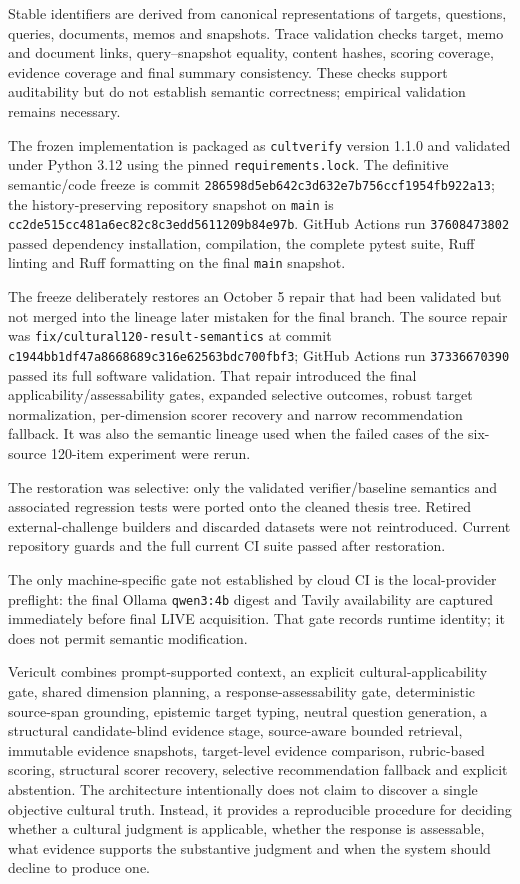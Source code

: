 Stable identifiers are derived from canonical representations of targets, questions, queries, documents, memos and snapshots. Trace validation checks target, memo and document links, query--snapshot equality, content hashes, scoring coverage, evidence coverage and final summary consistency. These checks support auditability but do not establish semantic correctness; empirical validation remains necessary.

The frozen implementation is packaged as \texttt{cultverify} version 1.1.0 and validated under Python 3.12 using the pinned \texttt{requirements.lock}. The definitive semantic/code freeze is commit \texttt{286598d5eb642c3d632e7b756ccf1954fb922a13}; the history-preserving repository snapshot on \texttt{main} is \texttt{cc2de515cc481a6ec82c8c3edd5611209b84e97b}. GitHub Actions run \texttt{37608473802} passed dependency installation, compilation, the complete pytest suite, Ruff linting and Ruff formatting on the final \texttt{main} snapshot.

The freeze deliberately restores an October 5 repair that had been validated but not merged into the lineage later mistaken for the final branch. The source repair was \texttt{fix/cultural120-result-semantics} at commit \texttt{c1944bb1df47a8668689c316e62563bdc700fbf3}; GitHub Actions run \texttt{37336670390} passed its full software validation. That repair introduced the final applicability/assessability gates, expanded selective outcomes, robust target normalization, per-dimension scorer recovery and narrow recommendation fallback. It was also the semantic lineage used when the failed cases of the six-source 120-item experiment were rerun.

The restoration was selective: only the validated verifier/baseline semantics and associated regression tests were ported onto the cleaned thesis tree. Retired external-challenge builders and discarded datasets were not reintroduced. Current repository guards and the full current CI suite passed after restoration.

The only machine-specific gate not established by cloud CI is the local-provider preflight: the final Ollama \texttt{qwen3:4b} digest and Tavily availability are captured immediately before final LIVE acquisition. That gate records runtime identity; it does not permit semantic modification.

Vericult combines prompt-supported context, an explicit cultural-applicability gate, shared dimension planning, a response-assessability gate, deterministic source-span grounding, epistemic target typing, neutral question generation, a structural candidate-blind evidence stage, source-aware bounded retrieval, immutable evidence snapshots, target-level evidence comparison, rubric-based scoring, structural scorer recovery, selective recommendation fallback and explicit abstention. The architecture intentionally does not claim to discover a single objective cultural truth. Instead, it provides a reproducible procedure for deciding whether a cultural judgment is applicable, whether the response is assessable, what evidence supports the substantive judgment and when the system should decline to produce one.

